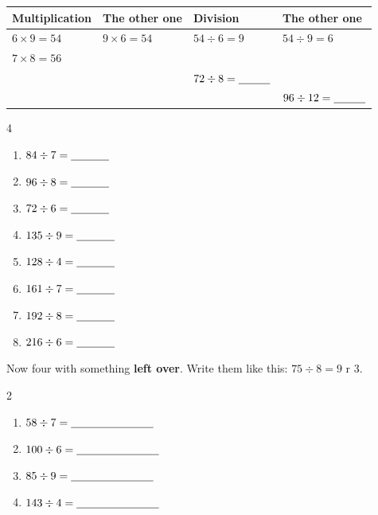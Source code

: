 \documentclass[12pt,a4paper]{article}
\begin{document}
\vspace{2pt}
\noindent
\begin{tabularx}{\textwidth}{|X|X|X|X|}
  \hline
  \textbf{Multiplication} & \textbf{The other one} & \textbf{Division} &
  \textbf{The other one} \\
  \hline
  $6 \times 9 = 54$ \rule[-0.7em]{0pt}{2.2em} & $9 \times 6 = 54$ &
  $54 \div 6 = 9$ & $54 \div 9 = 6$ \\ \hline
  $7 \times 8 = 56$ \rule[-0.7em]{0pt}{2.2em} & & & \\ \hline
  \rule[-0.7em]{0pt}{2.2em} & & $72 \div 8 = \blank[1.0cm]$ & \\ \hline
  \rule[-0.7em]{0pt}{2.2em} & & & $96 \div 12 = \blank[1.0cm]$ \\ \hline
\end{tabularx}


\vspace{2pt}
\begin{multicols}{4}
\begin{enumerate}[label=(\alph*), itemsep=10pt]
  \item $84 \div 7 = \blank[1.2cm]$
  \item $96 \div 8 = \blank[1.2cm]$
  \item $72 \div 6 = \blank[1.2cm]$
  \item $135 \div 9 = \blank[1.2cm]$
  \item $128 \div 4 = \blank[1.2cm]$
  \item $161 \div 7 = \blank[1.2cm]$
  \item $192 \div 8 = \blank[1.2cm]$
  \item $216 \div 6 = \blank[1.2cm]$
\end{enumerate}
\end{multicols}

\vspace{2pt}
\noindent Now four with something \textbf{left over}. Write them like this:
\; $75 \div 8 = 9$ r 3.

\vspace{4pt}
\begin{multicols}{2}
\begin{enumerate}[label=(\alph*), start=9, itemsep=11pt]
  \item $58 \div 7 = \blank[2.6cm]$
  \item $100 \div 6 = \blank[2.6cm]$
  \item $85 \div 9 = \blank[2.6cm]$
  \item $143 \div 4 = \blank[2.6cm]$
\end{enumerate}
\end{multicols}
\end{document}
